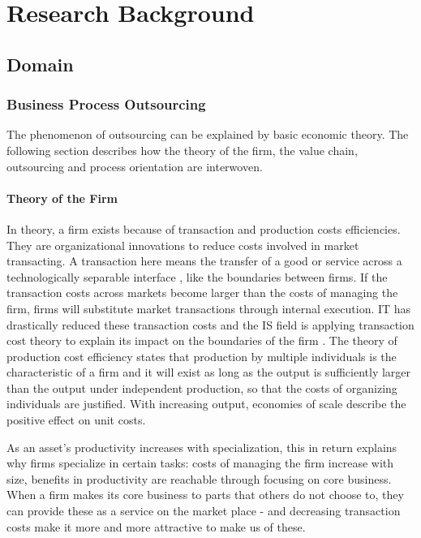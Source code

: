 
\chapter{Research Background}
	\section{Domain}
		\subsection{Business Process Outsourcing}
		The phenomenon of outsourcing can be explained by basic economic theory. The following section describes how the theory of the firm, the value chain, outsourcing and process orientation are interwoven. 
		
		
		\subsubsection{Theory of the Firm}
		In theory, a firm exists because of transaction and production costs efficiencies. They are organizational innovations to reduce costs involved in market transacting. A transaction here means the transfer of a good or service across a technologically separable interface \citep{williamson1981economics, williamson1971vertical}, like the boundaries between firms. If the transaction costs across markets become larger than the costs of managing the firm, firms will substitute market transactions through internal execution. IT has drastically reduced these transaction costs and the IS field is applying transaction cost theory to explain its impact on the boundaries of the firm \citep{aron2005just}.
		The theory of production cost efficiency states that production by multiple individuals is the characteristic of a firm \citep{alchian1972production} and it will exist as long as the output is sufficiently larger than the output under independent production, so that the costs of organizing individuals are justified. With increasing output, economies of scale describe the positive effect on unit costs. 
		
		As an asset's productivity increases with specialization, this in return explains why firms specialize in certain tasks: costs of managing the firm increase with size,  benefits in productivity are reachable through focusing on core business.
		When a firm makes its core business to parts that others do not choose to, they can provide these as a service on the market place - and decreasing transaction costs make it more and more attractive to make us of these. 
		
